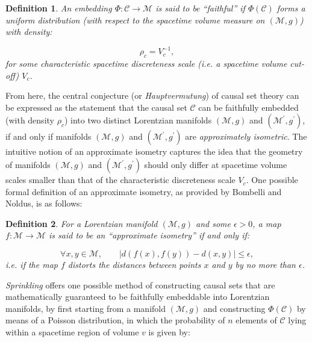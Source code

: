 \documentclass{article}
\newtheorem{definition}{Definition}
\begin{document}
\begin{definition}
An embedding ${\Phi : \mathcal{C} \to \mathcal{M}}$ is said to be ``faithful'' if ${\Phi \left( \mathcal{C} \right)}$ forms a uniform distribution (with respect to the spacetime volume measure on ${\left( \mathcal{M}, g \right)}$) with density:

\begin{equation}
\rho_c = V_{c}^{-1},
\end{equation}
for some characteristic spacetime discreteness scale (i.e. a spacetime volume cut-off) ${V_c}$.
\end{definition}
From here, the central conjecture (or \textit{Hauptvermutung}) of causal set theory can be expressed as the statement that the causal set ${\mathcal{C}}$ can be faithfully embedded (with density ${\rho_c}$) into two distinct Lorentzian manifolds ${\left( \mathcal{M}, g \right)}$ and ${\left( \mathcal{M}^{\prime}, g^{\prime} \right)}$, if and only if manifolds ${\left( \mathcal{M}, g \right)}$ and ${\left( \mathcal{M}^{\prime}, g^{\prime} \right)}$ are \textit{approximately isometric}. The intuitive notion of an approximate isometry captures the idea that the geometry of manifolds ${\left( \mathcal{M}, g \right)}$ and ${\left( \mathcal{M}^{\prime}, g^{\prime} \right)}$ should only differ at spacetime volume scales smaller than that of the characteristic discreteness scale ${V_c}$. One possible formal definition of an approximate isometry, as provided by Bombelli and Noldus\cite{bombelli6}, is as follows:

\begin{definition}
For a Lorentzian manifold ${\left( \mathcal{M}, g \right)}$ and some ${\epsilon > 0}$, a map ${f : \mathcal{M} \to \mathcal{M}}$ is said to be an ``approximate isometry'' if and only if:

\begin{equation}
\forall x, y \in \mathcal{M}, \qquad \left\lvert d \left( f \left( x \right), f \left( y \right) \right) - d \left( x, y \right) \right\rvert \leq \epsilon,
\end{equation}
i.e. if the map $f$ distorts the distances between points $x$ and $y$ by no more than ${\epsilon}$.
\end{definition}

\textit{Sprinkling} offers one possible method of constructing causal sets that are mathematically guaranteed to be faithfully embeddable into Lorentzian manifolds, by first starting from a manifold ${\left( \mathcal{M}, g \right)}$ and constructing ${\Phi \left( \mathcal{C} \right)}$ by means of a Poisson distribution, in which the probability of $n$ elements of ${\mathcal{C}}$ lying within a spacetime region of volume $v$ is given by:
\end{document}
